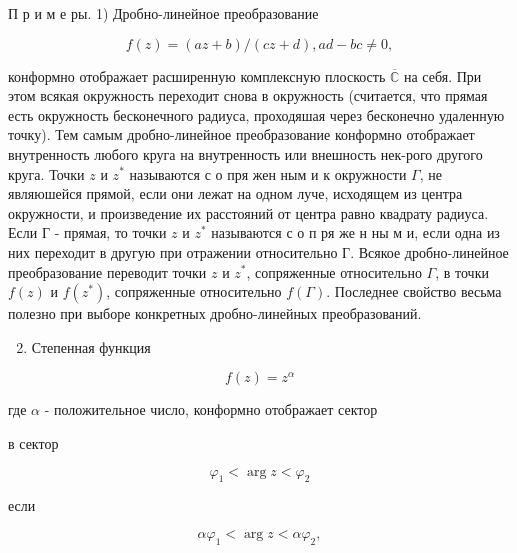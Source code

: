 \documentclass[10pt]{article}
\begin{document}
П р и м е ры. 1) Дробно-линейное преобразование



\[

f(z)=(a z+b) /(c z+d), a d-b c \neq 0,

\]



конформно отображает расширенную комплексную плоскость $\overline{\mathbb{C}}$ на себя. При этом всякая окружность переходит снова в окружность (считается, что прямая есть окружность бесконечного радиуса, проходяшая через бесконечно удаленную точку). Тем самым дробно-линейное преобразование конформно отображает внутренность любого круга на внутренность или внешность нек-рого другого круга. Точки $z$ и $z^{*}$ называются с о пря жен ным и к окружности $\Gamma$, не являюшейся прямой, если они лежат на одном луче, исходящем из центра окружности, и произведение их расстояний от центра равно квадрату радиуса. Если Г - прямая, то точки $z$ и $z^{*}$ называются с о п ря же н ны м и, если одна из них переходит в другую при отражении относительно Г. Всякое дробно-линейное преобразование переводит точки $z$ и $z^{*}$, сопряженные относительно $\Gamma$, в точки $f(z)$ и $f\left(z^{*}\right)$, сопряженные относительно $f(\Gamma)$. Последнее свойство весьма полезно при выборе конкретных дробно-линейных преобразований.



\begin{enumerate}

  \setcounter{enumi}{1}

  \item Степенная функция

\end{enumerate}



\[

f(z)=z^{\alpha}

\]



где $\alpha$ - положительное число, конформно отображает сектор



в сектор



\[

\varphi_{1}<\arg z<\varphi_{2}

\]



если



\[

\alpha \varphi_{1}<\arg z<\alpha \varphi_{2},

\]
\end{document}
